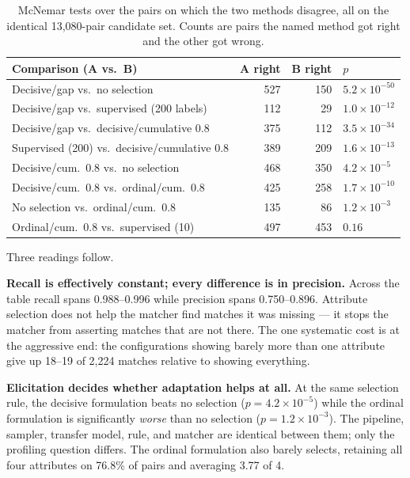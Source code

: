\documentclass[11pt]{article}
\begin{document}
\begin{table}[h]
\centering
\begin{tabular}{lrrl}
\toprule
Comparison (A vs.\ B) & A right & B right & $p$ \\
\midrule
Decisive/gap vs.\ no selection            & 527 & 150 & $5.2\times10^{-50}$ \\
Decisive/gap vs.\ supervised (200 labels) & 112 &  29 & $1.0\times10^{-12}$ \\
Decisive/gap vs.\ decisive/cumulative 0.8 & 375 & 112 & $3.5\times10^{-34}$ \\
Supervised (200) vs.\ decisive/cumulative 0.8 & 389 & 209 & $1.6\times10^{-13}$ \\
Decisive/cum.\ 0.8 vs.\ no selection      & 468 & 350 & $4.2\times10^{-5}$ \\
Decisive/cum.\ 0.8 vs.\ ordinal/cum.\ 0.8 & 425 & 258 & $1.7\times10^{-10}$ \\
No selection vs.\ ordinal/cum.\ 0.8       & 135 &  86 & $1.2\times10^{-3}$ \\
Ordinal/cum.\ 0.8 vs.\ supervised (10)    & 497 & 453 & $0.16$ \\
\bottomrule
\end{tabular}
\caption{McNemar tests over the pairs on which the two methods disagree, all on the identical
13{,}080-pair candidate set. Counts are pairs the named method got right and the other got
wrong.}
\end{table}

Three readings follow.

\textbf{Recall is effectively constant; every difference is in precision.} Across the table
recall spans 0.988--0.996 while precision spans 0.750--0.896. Attribute selection does not
help the matcher find matches it was missing --- it stops the matcher from asserting matches
that are not there. The one systematic cost is at the aggressive end: the configurations
showing barely more than one attribute give up 18--19 of 2{,}224 matches relative to showing
everything.

\textbf{Elicitation decides whether adaptation helps at all.} At the same selection rule, the
decisive formulation beats no selection ($p = 4.2\times10^{-5}$) while the ordinal
formulation is significantly \emph{worse} than no selection ($p = 1.2\times10^{-3}$). The
pipeline, sampler, transfer model, rule, and matcher are identical between them; only the
profiling question differs. The ordinal formulation also barely selects, retaining all four
attributes on 76.8\% of pairs and averaging 3.77 of 4.
\end{document}
